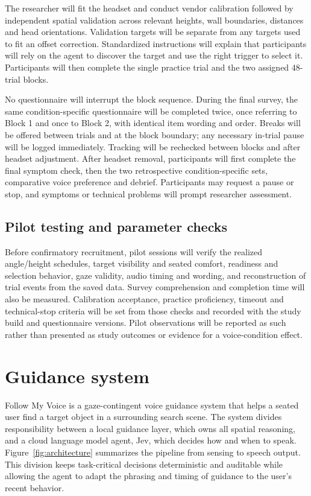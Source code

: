 \documentclass[11pt,letterpaper]{article}
\begin{document}
The researcher will fit the headset and conduct vendor calibration followed by independent spatial validation across relevant heights, wall boundaries, distances and head orientations. Validation targets will be separate from any targets used to fit an offset correction. Standardized instructions will explain that participants will rely on the agent to discover the target and use the right trigger to select it. Participants will then complete the single practice trial and the two assigned 48-trial blocks.

No questionnaire will interrupt the block sequence. During the final survey, the same condition-specific questionnaire will be completed twice, once referring to Block 1 and once to Block 2, with identical item wording and order. Breaks will be offered between trials and at the block boundary; any necessary in-trial pause will be logged immediately. Tracking will be rechecked between blocks and after headset adjustment. After headset removal, participants will first complete the final symptom check, then the two retrospective condition-specific sets, comparative voice preference and debrief. Participants may request a pause or stop, and symptoms or technical problems will prompt researcher assessment.

\subsection{Pilot testing and parameter checks}
Before confirmatory recruitment, pilot sessions will verify the realized angle/height schedules, target visibility and seated comfort, readiness and selection behavior, gaze validity, audio timing and wording, and reconstruction of trial events from the saved data. Survey comprehension and completion time will also be measured. Calibration acceptance, practice proficiency, timeout and technical-stop criteria will be set from those checks and recorded with the study build and questionnaire versions. Pilot observations will be reported as such rather than presented as study outcomes or evidence for a voice-condition effect.

\section{Guidance system}
Follow My Voice is a gaze-contingent voice guidance system that helps a seated user find a target object in a surrounding search scene. The system divides responsibility between a local guidance layer, which owns all spatial reasoning, and a cloud language model agent, Jev, which decides how and when to speak. Figure~\ref{fig:architecture} summarizes the pipeline from sensing to speech output. This division keeps task-critical decisions deterministic and auditable while allowing the agent to adapt the phrasing and timing of guidance to the user's recent behavior.
\end{document}
